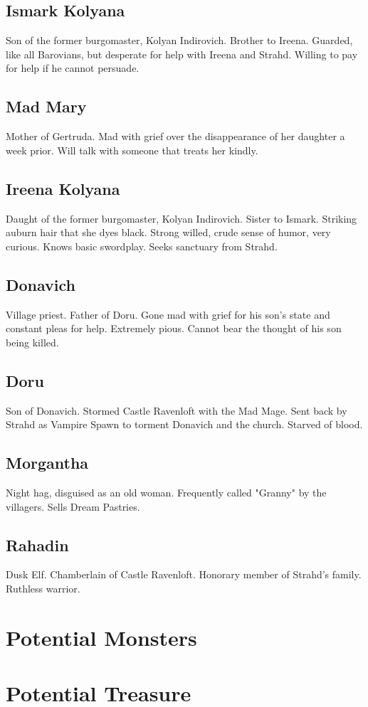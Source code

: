 \documentclass[a4paper,11pt]{article}
\begin{document}
\subsection{Ismark Kolyana}
  Son of the former burgomaster, Kolyan Indirovich. Brother to Ireena. Guarded, like all Barovians, but 
  desperate for help with Ireena and Strahd. Willing to pay for help if he cannot persuade.
\subsection{Mad Mary}
  Mother of Gertruda. Mad with grief over the disappearance of her daughter a week prior. Will talk with someone
  that treats her kindly.
\subsection{Ireena Kolyana}
  Daught of the former burgomaster, Kolyan Indirovich. Sister to Ismark. Striking auburn hair that she dyes 
  black. Strong willed, crude sense of humor, very curious. Knows basic swordplay. Seeks sanctuary from Strahd.
\subsection{Donavich}
  Village priest. Father of Doru. Gone mad with grief for his son's state and constant pleas for help. Extremely
  pious. Cannot bear the thought of his son being killed.
\subsection{Doru}
  Son of Donavich. Stormed Castle Ravenloft with the Mad Mage. Sent back by Strahd as Vampire Spawn to torment
  Donavich and the church. Starved of blood.
\subsection{Morgantha}
  Night hag, disguised as an old woman. Frequently called "Granny" by the villagers. Sells Dream Pastries.
\subsection{Rahadin}
  Dusk Elf. Chamberlain of Castle Ravenloft. Honorary member of Strahd's family. Ruthless warrior.

\pagebreak
\section{Potential Monsters}
\label{sec:PotentialMonsters}

\pagebreak
\section{Potential Treasure}
\label{sec:PotentialTreasure}
\end{document}
